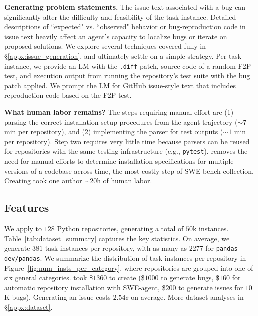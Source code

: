 \textbf{Generating problem statements.} 
The issue text associated with a bug can significantly alter the difficulty and feasibility of the task instance.
Detailed descriptions of ``expected" vs. ``observed" behavior or bug-reproduction code in issue text heavily affect an agent's capacity to localize bugs or iterate on proposed solutions.
We explore several techniques covered fully in \S\ref{appx:issue_generation}, and ultimately settle on a simple strategy.
Per task instance, we provide an LM with the \texttt{.diff} patch, source code of a random F2P test, and execution output from running the repository's test suite with the bug patch applied.
We prompt the LM for GitHub issue-style text that includes reproduction code based on the F2P test.

\textbf{What human labor remains?}
The steps requiring manual effort are (1) parsing the correct installation setup procedures from the agent trajectory ($\sim7$ min per repository), 
and (2) implementing the parser for test outputs ($\sim1$ min per repository).
Step two requires very little time because parsers can be reused for repositories with the same testing infrastructure (e.g., \texttt{pytest}).
\bugs{} removes the need for manual efforts to determine installation specifications for multiple versions of a codebase across time, the most costly step of SWE-bench collection.
Creating \bugs{} took one author $\sim{}20$h of human labor.

\subsection{Features}
\label{sec:swesmith:features}

We apply \bugs{} to $128$ Python repositories, generating a total of $50$k instances.
Table~\ref{tab:dataset_summary} captures the key statistics.
On average, we generate $381$ task instances per repository, with as many as $2277$ for \texttt{pandas-dev/pandas}.
We summarize the distribution of task instances per repository in Figure~\ref{fig:num_insts_per_category}, where repositories are grouped into one of six general categories.
\bugs{} took \$$1360$ to create (\$$1000$ to generate bugs, \$$160$ for automatic repository installation with SWE-agent, \$$200$ to generate issues for $10$K bugs).
Generating an issue costs $2.54$¢ on average.
More dataset analyses in \S\ref{appx:dataset}.

